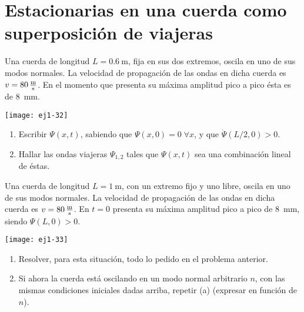 \section*{Estacionarias en una cuerda como superposición de viajeras}

\item 
\begin{minipage}[t][2cm]{0.6\textwidth}
Una cuerda de longitud $L = \SI{0.6}{\metre}$, fija en sus dos extremos, oscila en uno de sus modos normales.
La velocidad de propagación de las ondas en dicha cuerda es \(v = \SI{80}{\metre\over\second}\).
En el momento que presenta su máxima amplitud pico a pico ésta es de \SI{8}{\milli\metre}.
\end{minipage}
\begin{minipage}[c][1.5cm][t]{0.34\textwidth}
	\texttt{[image: ej1-32]}
\end{minipage}
\begin{enumerate}
	\item Escribir $\Psi(x,t)$, sabiendo que $\Psi(x,0) = 0\;\forall x$, y que $\dot{\Psi}(L/2,0) > 0$.
	\item Hallar las ondas viajeras $\Psi_{1,2}$ tales que $\Psi(x,t)$ sea una combinación lineal de éstas.
\end{enumerate}


\item 
\begin{minipage}[t][2.6cm]{0.6\textwidth}
Una cuerda de longitud $L = \SI{1}{\metre}$, con un extremo fijo y uno libre, oscila en uno de sus modos normales.
La velocidad de propagación de las ondas en dicha cuerda es \(v= \SI{80}{\metre\over\second}\).
En \(t = 0\) presenta su máxima amplitud pico a pico de \SI{8}{\milli\metre}, siendo $\Psi(L,0) > 0$.
\end{minipage}
\begin{minipage}[c][0.4cm][t]{0.34\textwidth}
	\texttt{[image: ej1-33]}
\end{minipage}
\begin{enumerate}
	\item Resolver, para esta situación, todo lo pedido en el problema anterior. 
	\item Si ahora la cuerda está oscilando en un modo normal arbitrario $n$, con las mismas condiciones iniciales dadas arriba, repetir (a) (expresar en función de $n$).
\end{enumerate}
